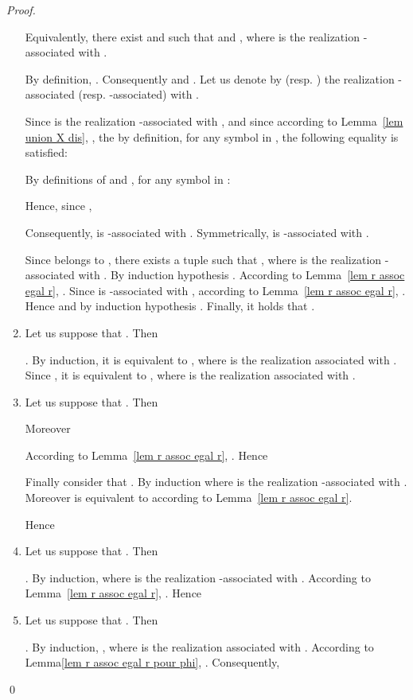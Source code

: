 \documentclass[a4paper]{llncs}
\begin{document}
\begin{proof}
\begin{enumerate}
      Equivalently, there exist  and   
      such that  and , where  is the realization -associated with .
      
      By definition, . Consequently  and . Let us denote by  (resp. ) the realization -associated (resp. -associated) with .
      
      Since  is the realization -associated with , and since according to Lemma~\ref{lem union X dis}, , the by definition, for any symbol  in , the following equality is satisfied:
            
    By definitions of  and ,  for any symbol  in :
            
    Hence, since ,
        
    Consequently,  is -associated with . Symmetrically,  is -associated with .
    
      Since  belongs to , there exists a tuple  such that , where  is the realization -associated with . By induction hypothesis . According to Lemma~\ref{lem r assoc egal r},   . Since  is -associated with , according to Lemma~\ref{lem r assoc egal r}, . Hence  and by induction hypothesis .      
      Finally, it holds that .
\item Let us suppose that . Then       
            
         .      
      By induction, it is equivalent to ,  where  is the realization  associated with .       
      Since , it is equivalent to ,  where  is the realization  associated with .
\item Let us suppose that . Then 
                    
      Moreover 
              
      According to Lemma~\ref{lem r assoc egal r},   .      
      Hence
              
      Finally consider that   .      
      By induction       
         where  is the realization -associated with .      
      Moreover    is equivalent to  according to Lemma~\ref{lem r assoc egal r}.
      
      Hence 
        
\item Let us suppose that . Then       
            
           .      
      By induction,       
         where  is the realization -associated with .      
      According to Lemma~\ref{lem r assoc egal r},       
       .      
      Hence 
        
\item Let us suppose that . Then      
            
         .      
      By induction,       
       ,  where  is the realization  associated with .      
      According to Lemma\ref{lem r assoc egal r pour phi}, .      
      Consequently, 
               
    \end{enumerate}    
    \qed
  \end{proof}
  
\end{document}
